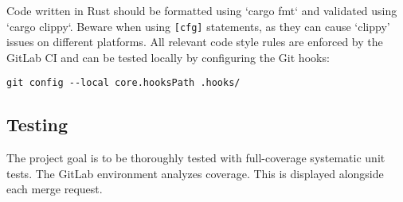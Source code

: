 Code written in Rust should be formatted using `cargo fmt` and validated using `cargo clippy`.
Beware when using \verb|[cfg]| statements, as they can cause `clippy' issues on different platforms.
All relevant code style rules are enforced by the GitLab CI and can be tested locally
by configuring the Git hooks:
\begin{lstlisting}
git config --local core.hooksPath .hooks/
\end{lstlisting}

\subsection{Testing}

The project goal is to be thoroughly tested with full-coverage systematic unit tests.
The GitLab environment analyzes coverage. This is displayed alongside each merge request.
